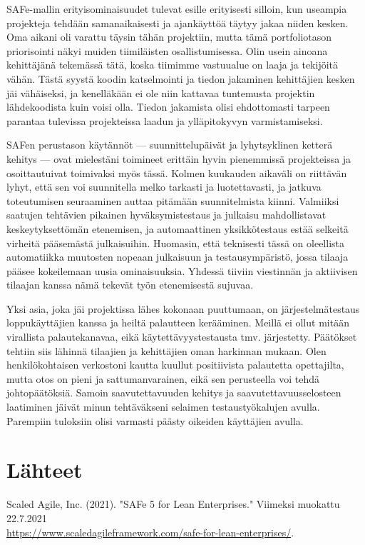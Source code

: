 \documentclass{article}
\begin{document}
SAFe-mallin erityisominaisuudet tulevat esille erityisesti silloin, kun
useampia projekteja tehdään samanaikai\-sesti ja ajankäyttöä täytyy jakaa
niiden kesken. Oma aikani oli varattu täysin tähän projektiin, mutta tämä
portfoliotason priorisointi näkyi muiden tiimiläisten osallistumisessa. Olin
usein ainoana kehittäjänä tekemässä tätä, koska tiimimme vastuualue on laaja ja
tekijöitä vähän. Tästä syystä koodin katselmointi ja tiedon jakaminen
kehittäjien kesken jäi vähäiseksi, ja kenelläkään ei ole niin kattavaa
tuntemusta projektin lähdekoodista kuin voisi olla. Tiedon jakamista olisi
ehdottomasti tarpeen parantaa tulevissa projekteissa laadun ja ylläpitokyvyn
varmistamiseksi.

SAFen perustason käytännöt — suunnittelupäivät ja lyhytsyklinen ketterä kehitys
— ovat mielestäni toimineet erittäin hyvin pienemmissä projekteissa ja
osoittautuivat toimivaksi myös tässä. Kolmen kuukauden aikaväli on riittävän
lyhyt, että sen voi suunnitella melko tarkasti ja luotettavasti, ja jatkuva
toteutumisen seuraaminen auttaa pitämään suunnitelmista kiinni. Valmiik\-si
saatujen tehtävien pikainen hyväksymistestaus ja julkaisu mahdollistavat
keskeytyksettömän etenemisen, ja automaattinen yksikkötestaus estää selkeitä
virheitä pääsemästä julkaisuihin. Huomasin, että teknisesti tässä on oleellista
automatiikka muutosten nopeaan julkai\-suun ja testausympäristö, jossa tilaaja
pääsee kokeilemaan uusia ominaisuuksia. Yhdessä tiiviin viestinnän ja
aktiivisen tilaajan kanssa nämä tekevät työn etenemisestä sujuvaa.

Yksi asia, joka jäi projektissa lähes kokonaan puuttumaan, on järjestelmätestaus
loppukäyttäjien kanssa ja heiltä palautteen kerääminen. Meillä ei ollut mitään
virallista palautekanavaa, eikä käy\-tettävyystestausta tmv. järjestetty. Päätökset
tehtiin siis lähinnä tilaajien ja kehittäjien oman harkinnan mukaan. Olen
henkilökohtaisen verkostoni kautta kuullut positiivista palautetta opettajilta,
mutta otos on pieni ja sattumanvarainen, eikä sen perusteella voi tehdä
johtopäätöksiä. Samoin saavutettavuuden kehitys ja saavutettavuusselosteen
laatiminen jäivät minun tehtäväkseni selai\-men testaustyökalujen avulla.
Parempiin tuloksiin olisi varmasti päästy oikeiden käyttäjien avulla.

\section{Lähteet}

Scaled Agile, Inc. (2021). "SAFe 5 for Lean Enterprises." Viimeksi muokattu 22.7.2021
\\ \url{https://www.scaledagileframework.com/safe-for-lean-enterprises/}.
\end{document}
